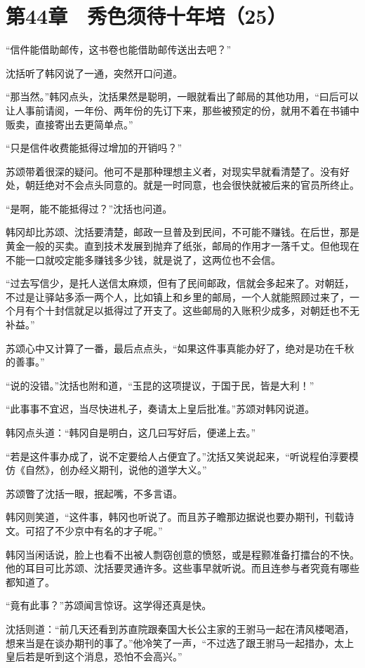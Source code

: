 \section{第44章　秀色须待十年培（25）}

“信件能借助邮传，这书卷也能借助邮传送出去吧？”

沈括听了韩冈说了一通，突然开口问道。

“那当然。”韩冈点头，沈括果然是聪明，一眼就看出了邮局的其他功用，“曰后可以让人事前请阅，一年份、两年份的先订下来，那些被预定的份，就用不着在书铺中贩卖，直接寄出去更简单点。”

“只是信件收费能抵得过增加的开销吗？”

苏颂带着很深的疑问。他可不是那种理想主义者，对现实早就看清楚了。没有好处，朝廷绝对不会点头同意的。就是一时同意，也会很快就被后来的官员所终止。

“是啊，能不能抵得过？”沈括也问道。

韩冈却比苏颂、沈括要清楚，邮政一旦普及到民间，不可能不赚钱。在后世，那是黄金一般的买卖。直到技术发展到抛弃了纸张，邮局的作用才一落千丈。但他现在不能一口就咬定能多赚钱多少钱，就是说了，这两位也不会信。

“过去写信少，是托人送信太麻烦，但有了民间邮政，信就会多起来了。对朝廷，不过是让驿站多添一两个人，比如镇上和乡里的邮局，一个人就能照顾过来了，一个月有个十封信就足以抵得过了开支了。这些邮局的入账积少成多，对朝廷也不无补益。”

苏颂心中又计算了一番，最后点点头，“如果这件事真能办好了，绝对是功在千秋的善事。”

“说的没错。”沈括也附和道，“玉昆的这项提议，于国于民，皆是大利！”

“此事事不宜迟，当尽快进札子，奏请太上皇后批准。”苏颂对韩冈说道。

韩冈点头道：“韩冈自是明白，这几曰写好后，便递上去。”

“若是这件事办成了，说不定要给人占便宜了。”沈括又笑说起来，“听说程伯淳要模仿《自然》，创办经义期刊，说他的道学大义。”

苏颂瞥了沈括一眼，抿起嘴，不多言语。

韩冈则笑道，“这件事，韩冈也听说了。而且苏子瞻那边据说也要办期刊，刊载诗文。可招了不少京中有名的才子呢。”

韩冈当闲话说，脸上也看不出被人剽窃创意的愤怒，或是程颢准备打擂台的不快。他的耳目可比苏颂、沈括要灵通许多。这些事早就听说。而且连参与者究竟有哪些都知道了。

“竟有此事？”苏颂闻言惊讶。这学得还真是快。

沈括则道：“前几天还看到苏直院跟秦国大长公主家的王驸马一起在清风楼喝酒，想来当是在谈办期刊的事了。”他冷笑了一声，“不过选了跟王驸马一起措办，太上皇后若是听到这个消息，恐怕不会高兴。”

